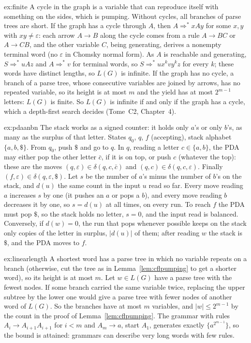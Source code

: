 \begin{solution}{ex:finite}
\idea A cycle in the graph is a variable that can reproduce itself with something on the sides, which is pumping. Without cycles, all branches of parse trees are short.
\writeup If the graph has a cycle through $A$, then $A\Rightarrow^*xAy$ for some $x,y$ with $xy\ne\varepsilon$: each arrow $A\to B$ along the cycle comes from a rule $A\to BC$ or $A\to CB$, and the other variable $C$, being generating, derives a nonempty terminal word (no $\varepsilon$ in Chomsky normal form). As $A$ is reachable and generating, $S\Rightarrow^*uAz$ and $A\Rightarrow^*v$ for terminal words, so $S\Rightarrow^*ux^kvy^kz$ for every $k$; these words have distinct lengths, so $L(G)$ is infinite. If the graph has no cycle, a branch of a parse tree, whose consecutive variables are joined by arrows, has no repeated variable, so its height is at most $m$ and the yield has at most $2^{m-1}$ letters: $L(G)$ is finite. So $L(G)$ is infinite if and only if the graph has a cycle, which a depth-first search decides (Tome~C2, Chapter~4).
\end{solution}

\begin{solution}{ex:pdaanbn}
\idea The stack works as a signed counter: it holds only $a$'s or only $b$'s, as many as the surplus of that letter.
\writeup States $q_0$, $q$, $f$ (accepting), stack alphabet $\{a,b,\$\}$. From $q_0$, push $\$$ and go to $q$. In $q$, reading a letter $c\in\{a,b\}$, the PDA may either pop the other letter $\bar c$, if it is on top, or push $c$ (whatever the top): these are the moves $(q,\varepsilon)\in\delta(q,c,\bar c)$ and $(q,c)\in\delta(q,c,\varepsilon)$. Finally $(f,\varepsilon)\in\delta(q,\varepsilon,\$)$.
Let $s$ be the number of $a$'s minus the number of $b$'s on the stack, and $d(u)$ the same count in the input $u$ read so far. Every move reading $a$ increases $s$ by one (it pushes an $a$ or pops a $b$), and every move reading $b$ decreases it by one, so $s=d(u)$ at all times, on every run. To reach $f$ the PDA must pop $\$$, so the stack holds no letter, $s=0$, and the input read is balanced. Conversely, if $d(w)=0$, the run that pops whenever possible keeps on the stack only copies of the letter in surplus, $|d(u)|$ of them; after reading $w$ the stack is $\$$, and the PDA moves to $f$.
\end{solution}

\begin{solution}{ex:linearlength}
\idea A shortest word has a parse tree in which no variable repeats on a branch (otherwise, cut the tree as in Lemma~\ref{lem:cflpumping} to get a shorter word), so its height is at most $m$.
\writeup Let $w\in L(G)$ have a parse tree with the fewest nodes. If some branch carried the same variable twice, replacing the upper subtree by the lower one would give a parse tree with fewer nodes of another word of $L(G)$. So the branches have at most $m$ variables, and $|w|\le2^{m-1}$ by the count in the proof of Lemma~\ref{lem:cflpumping}. The grammar with rules $A_i\to A_{i+1}A_{i+1}$ for $i<m$ and $A_m\to a$, start $A_1$, generates exactly $\{a^{2^{m-1}}\}$, so the bound is attained: grammars can describe very long words with few rules.
\end{solution}

